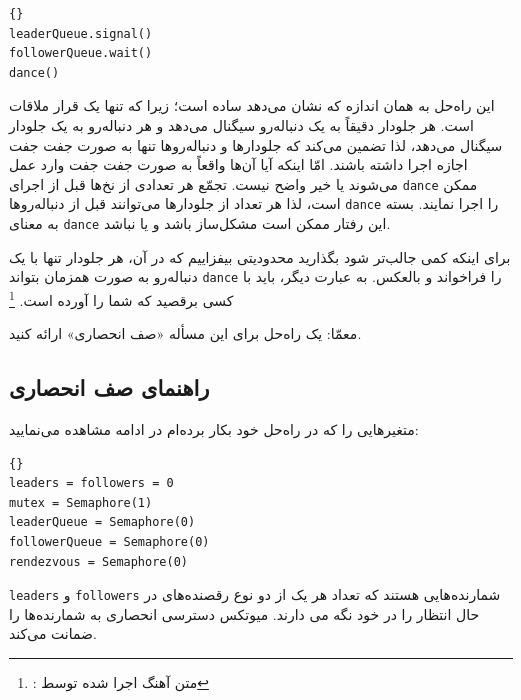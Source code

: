 \documentclass{book}
\newcommand{\clearemptydoublepage}{}%
\begin{document}
\begin{latin}
\begin{lstlisting}[title=\rl{راه‌حل صف (دنباله‌روها)}]{}
leaderQueue.signal()
followerQueue.wait()
dance()
\end{lstlisting}
\end{latin}
    این راه‌حل به همان اندازه که نشان می‌دهد ساده‌ است؛ زیرا که تنها یک قرار ملاقات است.
    هر جلودار دقیقاً به یک دنباله‌رو سیگنال می‌دهد و هر دنباله‌رو به یک جلودار سیگنال می‌دهد، لذا تضمین می‌کند که جلو‌دارها و دنباله‌روها تنها 
    به صورت جفت جفت اجازه اجرا داشته باشند.  امّا اینکه آیا آ‌ن‌ها واقعاً به صورت جفت جفت وارد عمل می‌شوند یا خیر واضح نیست. 
    تجمّع هر تعدادی از نخ‌ها     قبل از اجرای \texttt{dance} ممکن است، لذا هر تعداد از جلودارها می‌توانند قبل از دنباله‌روها  \texttt{dance} را اجرا نمایند. 
    بسته به معنای \texttt{dance} این رفتار ممکن است مشکل‌ساز باشد و یا نباشد. 

    برای اینکه کمی جالب‌تر شود بگذارید محدودیتی بیفزاییم که در آن، هر جلودار تنها با یک دنباله‌رو به صورت همزمان بتواند \texttt{dance} را 
    فراخواند و بالعکس. به عبارت دیگر، باید با کسی برقصید که شما را آورده است.%
    \footnote{%
    : متن آهنگ اجرا شده توسط }

    معمّا: یک راه‌حل برای این مسأله «صف انحصاری» ارائه کنید.

\clearemptydoublepage
\subsection {راهنمای صف انحصاری}

    متغیرهایی را که در راه‌حل خود بکار برده‌ام در ادامه مشاهده می‌نمایید:

\begin{latin}
\begin{lstlisting}[title={\rl{راهنمای صف}}]{}
leaders = followers = 0
mutex = Semaphore(1)
leaderQueue = Semaphore(0)
followerQueue = Semaphore(0)
rendezvous = Semaphore(0)
\end{lstlisting}
\end{latin}

    \texttt{leaders} و \texttt{followers}
    شمارنده‌هایی هستند که تعداد هر یک از دو نوع رقصنده‌های در حال انتظار را در خود نگه می دارند. 
    میوتکس دسترسی انحصاری به شمارنده‌ها را ضمانت می‌کند.
\end{document}
